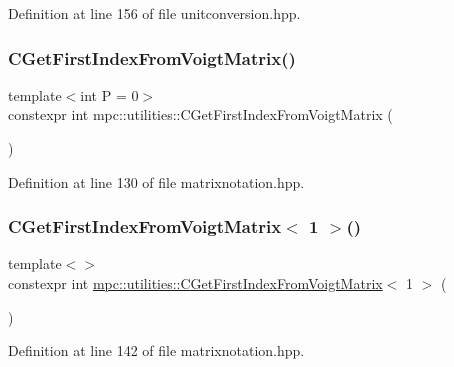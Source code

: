 Definition at line 156 of file unitconversion.\+hpp.

\mbox{\label{namespacempc_1_1utilities_acb1091d4fd58c0821eeeba68a43146ac}} 
\subsubsection{\texorpdfstring{C\+Get\+First\+Index\+From\+Voigt\+Matrix()}{CGetFirstIndexFromVoigtMatrix()}}
{\footnotesize\ttfamily template$<$int P = 0$>$ \\
constexpr int mpc\+::utilities\+::\+C\+Get\+First\+Index\+From\+Voigt\+Matrix (\begin{DoxyParamCaption}{ }\end{DoxyParamCaption})\hspace{0.3cm}{\ttfamily [inline]}}



Definition at line 130 of file matrixnotation.\+hpp.

\mbox{\label{namespacempc_1_1utilities_a9d279abaf7dfef3e9192f7b778eb68fa}} 
\subsubsection{\texorpdfstring{C\+Get\+First\+Index\+From\+Voigt\+Matrix$<$ 1 $>$()}{CGetFirstIndexFromVoigtMatrix< 1 >()}}
{\footnotesize\ttfamily template$<$$>$ \\
constexpr int \mbox{\hyperlink{namespacempc_1_1utilities_acb1091d4fd58c0821eeeba68a43146ac}{mpc\+::utilities\+::\+C\+Get\+First\+Index\+From\+Voigt\+Matrix}}$<$ 1 $>$ (\begin{DoxyParamCaption}{ }\end{DoxyParamCaption})\hspace{0.3cm}{\ttfamily [inline]}}



Definition at line 142 of file matrixnotation.\+hpp.

